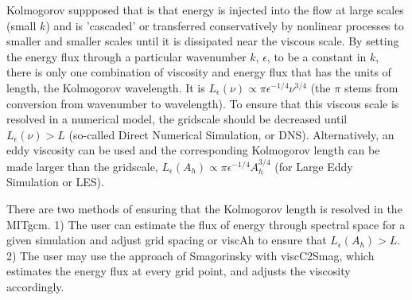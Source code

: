 Kolmogorov suppposed that is that energy is injected into the flow at
large scales (small $k$) and is 'cascaded' or transferred
conservatively by nonlinear processes to smaller and smaller scales
until it is dissipated near the viscous scale.  By setting the energy
flux through a particular wavenumber $k$, $\epsilon$, to be a constant
in $k$, there is only one combination of viscosity and energy flux
that has the units of length, the Kolmogorov wavelength.  It is
$L_\epsilon(\nu)\propto\pi\epsilon^{-1/4}\nu^{3/4}$ (the $\pi$ stems
from conversion from wavenumber to wavelength).  To ensure that this
viscous scale is resolved in a numerical model, the gridscale should
be decreased until $L_\epsilon(\nu)>L$ (so-called Direct Numerical
Simulation, or DNS).  Alternatively, an eddy viscosity can be used and
the corresponding Kolmogorov length can be made larger than the
gridscale, $L_\epsilon(A_h)\propto\pi\epsilon^{-1/4}A_h^{3/4}$ (for
Large Eddy Simulation or LES).

There are two methods of ensuring that the Kolmogorov length is
resolved in the MITgcm.  1) The user can estimate the flux of energy
through spectral space for a given simulation and adjust grid spacing
or {\sf viscAh} to ensure that $L_\epsilon(A_h)>L$.  2) The user may
use the approach of Smagorinsky with {\sf viscC2Smag}, which estimates
the energy flux at every grid point, and adjusts the viscosity
accordingly.

